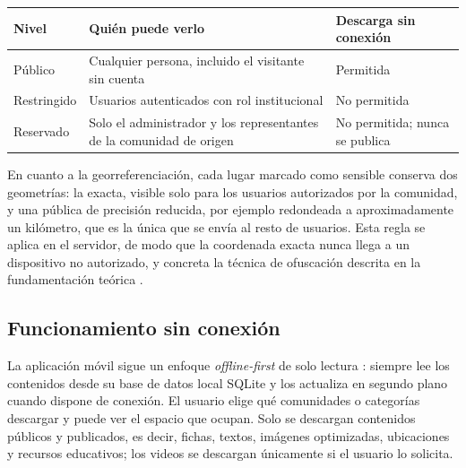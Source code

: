 {\centering\singlespacing
  \label{tab:niveles_acceso}
  \begin{tabular}{|p{}|p{}|p{}|}
    \hline
    \textbf{Nivel} & \textbf{Quién puede verlo} & \textbf{Descarga sin conexión} \tabularnewline
    \hline
    \raggedright\hspace{0pt}Público & \raggedright\hspace{0pt}Cualquier persona, incluido el visitante sin cuenta & \raggedright\hspace{0pt}Permitida \tabularnewline
    \hline
    \raggedright\hspace{0pt}Restringido & \raggedright\hspace{0pt}Usuarios autenticados con rol institucional & \raggedright\hspace{0pt}No permitida \tabularnewline
    \hline
    \raggedright\hspace{0pt}Reservado & \raggedright\hspace{0pt}Solo el administrador y los representantes de la comunidad de origen & \raggedright\hspace{0pt}No permitida; nunca se publica \tabularnewline
    \hline
  \end{tabular}\par}

En cuanto a la georreferenciación, cada lugar marcado como sensible conserva dos geometrías: la exacta, visible solo para los usuarios autorizados por la comunidad, y una pública de precisión reducida, por ejemplo redondeada a aproximadamente un kilómetro, que es la única que se envía al resto de usuarios. Esta regla se aplica en el servidor, de modo que la coordenada exacta nunca llega a un dispositivo no autorizado, y concreta la técnica de ofuscación descrita en la fundamentación teórica \cite{duckham2005obfuscation}.

\subsection{Funcionamiento sin conexión}
La aplicación móvil sigue un enfoque \textit{offline-first} de solo lectura \cite{kleppmann2019local}: siempre lee los contenidos desde su base de datos local SQLite y los actualiza en segundo plano cuando dispone de conexión. El usuario elige qué comunidades o categorías descargar y puede ver el espacio que ocupan. Solo se descargan contenidos públicos y publicados, es decir, fichas, textos, imágenes optimizadas, ubicaciones y recursos educativos; los videos se descargan únicamente si el usuario lo solicita.

